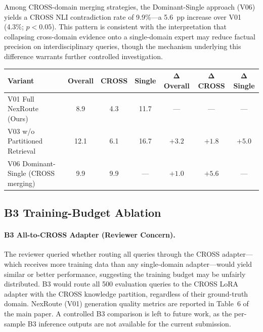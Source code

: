 \documentclass[a4paper,fleql,doubleblind]{cas-sc}
\begin{document}
Among CROSS-domain merging strategies, the Dominant-Single approach (V06)
yields a CROSS NLI contradiction rate of 9.9\%---a 5.6~pp increase over V01
(4.3\%; $p{<}0.05$). This pattern is consistent with the interpretation that
collapsing cross-domain evidence onto a single-domain expert may reduce
factual precision on interdisciplinary queries, though the mechanism
underlying this difference warrants further controlled investigation.

\begin{center}
\begingroup
\begin{tabular}{lcccccc}
\toprule
\textbf{Variant} & \textbf{Overall} & \textbf{CROSS} & \textbf{Single} & $\boldsymbol{\Delta}$\textbf{Overall} & $\boldsymbol{\Delta}$\textbf{CROSS} & $\boldsymbol{\Delta}$\textbf{Single} \\
\midrule
V01 Full NexRoute (Ours) & 8.9 & 4.3 & 11.7 & --- & --- & --- \\
V03 w/o Partitioned Retrieval & 12.1 & 6.1 & 16.7 & $+3.2$ & $+1.8$ & $+5.0$ \\
V06 Dominant-Single (CROSS merging) & 9.9 & 9.9 & --- & $+1.0$ & $+5.6$ & --- \\
\midrule
\end{tabular}
\label{tab:ablation_extended}
\endgroup
\end{center}

\subsection{B3 Training-Budget Ablation}
\label{supp:ablation_v02_b3}

\paragraph{B3 All-to-CROSS Adapter (Reviewer Concern).}
The reviewer queried whether routing all queries through the CROSS adapter---which
receives more training data than any single-domain adapter---would yield similar
or better performance, suggesting the training budget may be unfairly distributed.
B3 would route all 500 evaluation queries to the CROSS LoRA adapter with the CROSS
knowledge partition, regardless of their ground-truth domain.
NexRoute (V01) generation quality metrics are reported in Table~6 of the main paper.
A controlled B3 comparison is left to future work, as the per-sample B3 inference
outputs are not available for the current submission.
\end{document}
